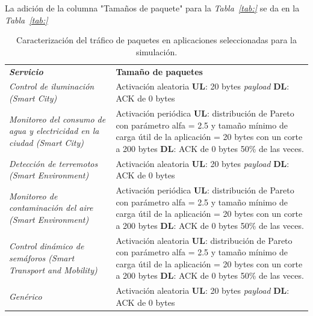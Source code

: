 La adición de la columna "Tamaños de paquete" para la \textit{Tabla~\ref{tab:}} se da en la \textit{Tabla~\ref{tab:}}\newline

\begin{table}
\caption{Caracterización del tráfico de paquetes en aplicaciones seleccionadas para la simulación.}
\label{tab:trafpkt}
\centering
\begin{tabular}{*{2}{m{7cm}}}\\ 
\textbf{\textit{Servicio}} & \textbf{Tamaño de paquetes} \\ 
\textit{Control de iluminación (Smart City) } & \footnotesize{ Activación aleatoria \textbf{UL}: 20 bytes \textit{payload} \textbf{DL}: ACK de 0 bytes } \\ \hline 
\textit{Monitoreo del consumo de agua y electricidad en la ciudad (Smart City) } & \footnotesize{ Activación periódica \textbf{UL}: distribución de Pareto con parámetro alfa = 2.5 y tamaño mínimo de carga útil de la aplicación = 20 bytes con un corte a 200 bytes \textbf{DL}: ACK de 0 bytes 50\% de las veces. } \\ \hline 
\textit{Detección de terremotos (Smart Environment)}  & \footnotesize{ Activación aleatoria \textbf{UL}: 20 bytes \textit{payload} \textbf{DL}: ACK de 0 bytes } \\ \hline 
\textit{Monitoreo de contaminación del aire (Smart Environment) } & \footnotesize{ Activación periódica \textbf{UL}: distribución de Pareto con parámetro alfa = 2.5 y tamaño mínimo de carga útil de la aplicación = 20 bytes con un corte a 200 bytes \textbf{DL}: ACK de 0 bytes 50\% de las veces. } \\ \hline 
\textit{Control dinámico de semáforos (Smart Transport and Mobility)}  & \footnotesize{ Activación aleatoria \textbf{UL}: distribución de Pareto con parámetro alfa = 2.5 y tamaño mínimo de carga útil de la aplicación = 20 bytes con un corte a 200 bytes \textbf{DL}: ACK de 0 bytes 50\% de las veces. } \\ \hline 
\textit{Genérico}  & \footnotesize{ Activación aleatoria \textbf{UL}: 20 bytes \textit{payload} \textbf{DL}: ACK de 0 bytes } \\  
\end{tabular}
\end{table}



